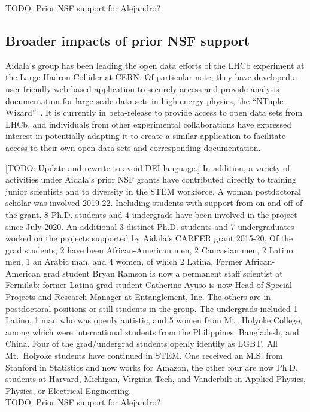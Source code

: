 TODO: Prior NSF support for Alejandro?



\subsection{Broader impacts of prior NSF support}
Aidala's group has been leading the open data efforts of the LHCb experiment at the Large Hadron Collider at CERN.  Of particular note, they have developed a user-friendly web-based application to securely access and provide analysis documentation for large-scale data sets in high-energy physics, the ``NTuple Wizard''~\cite{Aidala:2023dai}.  It is currently in beta-release to provide access to open data sets from LHCb, and individuals from other experimental collaborations have expressed interest in potentially adapting it to create a similar application to facilitate access to their own open data sets and corresponding documentation.

[TODO: Update and rewrite to avoid DEI language.] In addition, a variety of activities under Aidala's prior NSF grants have contributed directly to training junior scientists and to diversity in the STEM workforce.  A woman postdoctoral scholar was involved 2019-22. Including students with support from on and off of the grant, 8 Ph.D. students and 4 undergrads have been involved in the project since July 2020. An additional 3 distinct Ph.D. students and 7 undergraduates worked on the projects supported by Aidala's CAREER grant 2015-20.  Of the grad students, 2 have been African-American men, 2 Caucasian men, 2 Latino men, 1 an Arabic man, and 4 women, of which 2 Latina.  Former African-American grad student Bryan Ramson is now a permanent staff scientist at Fermilab; former Latina grad student Catherine Ayuso is now Head of Special Projects and Research Manager at Entanglement, Inc.  The others are in postdoctoral positions or still students in the group.  The undergrads included 1 Latino, 1 man who was openly autistic, and 5 women from Mt.~Holyoke College, among which were international students from the Philippines, Bangladesh, and China. Four of the grad/undergrad students openly identify as LGBT.  All Mt.~Holyoke students have continued in STEM.  One received an M.S. from Stanford in Statistics and now works for Amazon, the other four are now Ph.D. students at Harvard, Michigan, Virginia Tech, and Vanderbilt in Applied Physics, Physics, or Electrical Engineering.  \\

TODO: Prior NSF support for Alejandro?




\newpage






